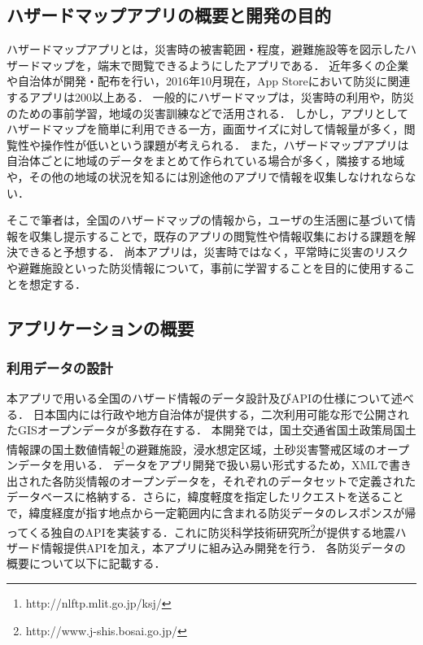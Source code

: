 \documentclass[a4paper]{jsarticle}
\begin{document}
\subsection{ハザードマップアプリの概要と開発の目的}
ハザードマップアプリとは，災害時の被害範囲・程度，避難施設等を図示したハザードマップを，端末で閲覧できるようにしたアプリである．
近年多くの企業や自治体が開発・配布を行い，2016年10月現在，App Storeにおいて防災に関連するアプリは200以上ある．
一般的にハザードマップは，災害時の利用や，防災のための事前学習，地域の災害訓練などで活用される．
しかし，アプリとしてハザードマップを簡単に利用できる一方，画面サイズに対して情報量が多く，閲覧性や操作性が低いという課題が考えられる．
また，ハザードマップアプリは自治体ごとに地域のデータをまとめて作られている場合が多く，隣接する地域や，その他の地域の状況を知るには別途他のアプリで情報を収集しなけれならない．

そこで筆者は，全国のハザードマップの情報から，ユーザの生活圏に基づいて情報を収集し提示することで，既存のアプリの閲覧性や情報収集における課題を解決できると予想する．
尚本アプリは，災害時ではなく，平常時に災害のリスクや避難施設といった防災情報について，事前に学習することを目的に使用することを想定する．


\subsection{アプリケーションの概要}

\subsubsection{利用データの設計}
本アプリで用いる全国のハザード情報のデータ設計及びAPIの仕様について述べる．
日本国内には行政や地方自治体が提供する，二次利用可能な形で公開されたGISオープンデータが多数存在する．
本開発では，国土交通省国土政策局国土情報課の国土数値情報\footnote{http://nlftp.mlit.go.jp/ksj/}の避難施設，浸水想定区域，土砂災害警戒区域のオープンデータを用いる．
データをアプリ開発で扱い易い形式するため，XMLで書き出された各防災情報のオープンデータを，それぞれのデータセットで定義されたデータベースに格納する．さらに，緯度軽度を指定したリクエストを送ることで，緯度経度が指す地点から一定範囲内に含まれる防災データのレスポンスが帰ってくる独自のAPIを実装する．これに防災科学技術研究所\footnote{http://www.j-shis.bosai.go.jp/}が提供する地震ハザード情報提供APIを加え，本アプリに組み込み開発を行う．
各防災データの概要について以下に記載する．
\end{document}
